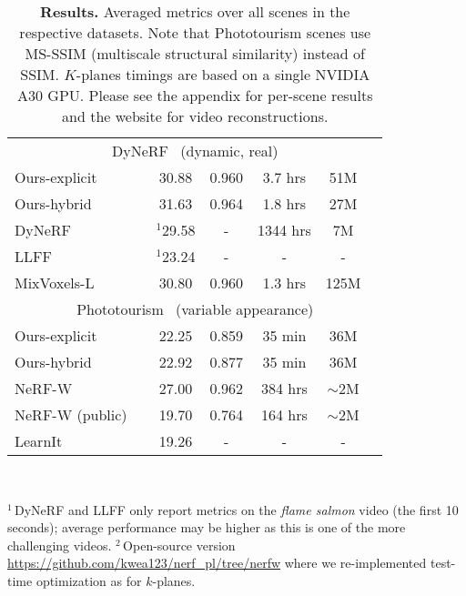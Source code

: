 \documentclass[10pt,twocolumn,letterpaper]{article}
\newcommand{\modelname}{$k$-planes}
\newcommand{\Modelname}{$K$-planes}
\begin{document}
\begin{table}
{\begin{threeparttable}
\begin{tabular}{@{}llccccc@{}}
    \multicolumn{7}{c}{DyNeRF~\cite{dynerf} (dynamic, real)}               \\
    \cmidrule(r){1-1} \cmidrule(l){3-7}
    Ours-explicit              && 30.88 & 0.960 & 3.7 hrs & 51M            \\
    Ours-hybrid                && 31.63 & 0.964 & 1.8 hrs & 27M            \\
    DyNeRF~\cite{dynerf}       && $^1$29.58 & - & 1344 hrs  & 7M      \\
    LLFF~\cite{llff}           && $^1$23.24 & - & - & -               \\
    MixVoxels-L\cite{mixvoxels}&& 30.80 & 0.960 & 1.3 hrs & 125M\\
    \cmidrule{1-7}

    \multicolumn{7}{c}{Phototourism~\cite{phototourism} (variable appearance)} \\
    \cmidrule(r){1-1} \cmidrule(l){3-7}  
    Ours-explicit  && 22.25 & 0.859 & 35 min & 36M                         \\
    Ours-hybrid  && 22.92 & 0.877 & 35 min & 36M                           \\
    NeRF-W~\cite{martinbrualla2020nerfw} && 27.00 & 0.962 & 384 hrs & $\sim$2M           \\
    NeRF-W (public)\tnote{2}       && 19.70 & 0.764 & 164 hrs & $\sim$2M       \\
    LearnIt \cite{learnit}     && 19.26 & - & - & -                        \\
    \bottomrule
   \end{tabular}
  \end{threeparttable}
 }
 \\
 {
  \footnotesize $^1$\,DyNeRF and LLFF only report metrics on the \emph{flame salmon} video (the first 10 seconds); average performance may be higher as this is one of the more challenging videos.
  $^2$\,Open-source version \url{https://github.com/kwea123/nerf_pl/tree/nerfw} where we re-implemented test-time optimization as for \modelname{}.
  \par
 }
 \caption{\textbf{Results.} 
    Averaged metrics over all scenes in the respective datasets. Note that Phototourism scenes use MS-SSIM (multiscale structural similarity) instead of SSIM. 
\Modelname{} timings are based on a single NVIDIA A30 GPU. 
   Please see the appendix for per-scene results and the website for video reconstructions. 
 }\label{tab:results}
 \vspace{-2em}
\end{table}
\end{document}
